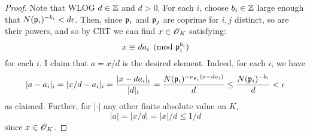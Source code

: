 \begin{proof}
	Note that WLOG $d \in \mathbb{Z}$ and $d > 0$. For each $i$, choose $b_i \in \mathbb{Z}$ large enough that $N(\mathfrak{p}_i)^{-b_i} < d\epsilon$. Then, since $\mathfrak{p}_i$ and $\mathfrak{p}_j$ are coprime for $i,j$ distinct, so are their powers, and so by CRT we can find $x \in \mathscr{O}_K$ satisfying:
	\[ x \equiv da_i \pmod{\mathfrak{p}_i^{b_i}} \]
	for each $i$. I claim that $a = x/d$ is the desired element. Indeed, for each $i$, we have
	\[ |a-a_i|_i = |x/d-a_i|_i = \frac{|x-da_i|_i}{|d|_i} = \frac{N(\mathfrak{p}_i)^{-\nu_{\mathfrak{p}_i}(x-da_i)}}{d} \leq \frac{N(\mathfrak{p}_i)^{-b_i}}{d} < \epsilon \]
	as claimed. Further, for $|\cdot|$ any other finite absolute value on $K$,
	\[ |a| = |x/d| = |x|/d \leq 1/d \]
	since $x \in \mathscr{O}_K$.
\end{proof}
